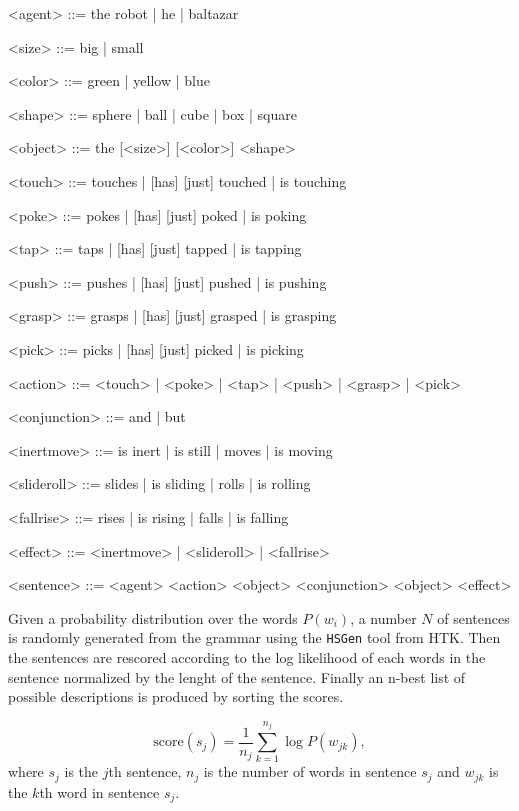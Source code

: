 \begin{grammar}
  <agent> ::= the robot | he | baltazar 

  <size> ::= big | small
  
  <color> ::= green | yellow | blue
  
  <shape> ::= sphere | ball | cube | box | square
  
  <object> ::= the [<size>] [<color>] <shape>
  
  <touch> ::= touches | [has] [just] touched | is touching
  
  <poke> ::= pokes | [has] [just] poked | is poking
  
  <tap> ::= taps | [has] [just] tapped | is tapping
  
  <push> ::= pushes | [has] [just] pushed | is pushing
  
  <grasp> ::= grasps | [has] [just] grasped | is grasping
  
  <pick> ::= picks | [has] [just] picked | is picking
  
  <action> ::= <touch> | <poke> | <tap> | <push> | <grasp> | <pick>
  
  <conjunction> ::= and | but
  
  <inertmove> ::= is inert | is still | moves | is moving
  
  <slideroll> ::= slides | is sliding | rolls | is rolling
  
  <fallrise> ::= rises | is rising | falls | is falling
  
  <effect> ::= <inertmove> | <slideroll> | <fallrise>
  
  <sentence> ::= <agent> <action> <object> <conjunction> <object> <effect>
\end{grammar}

Given a probability distribution over the words $P(w_i)$, a number $N$ of sentences is randomly generated from the grammar using the \texttt{HSGen} tool from HTK.
Then the sentences are rescored according to the log likelihood of each words in the sentence normalized by the lenght of the sentence.
Finally an n-best list of possible descriptions is produced by sorting the scores.

\begin{equation*}
  \text{score}(s_j) = \frac{1}{n_j} \sum_{k=1}^{n_j} \log P(w_{jk}),
\end{equation*}
where $s_j$ is the $j$th sentence, $n_j$ is the number of words in sentence $s_j$ and $w_{jk}$ is the $k$th word in sentence $s_j$.

